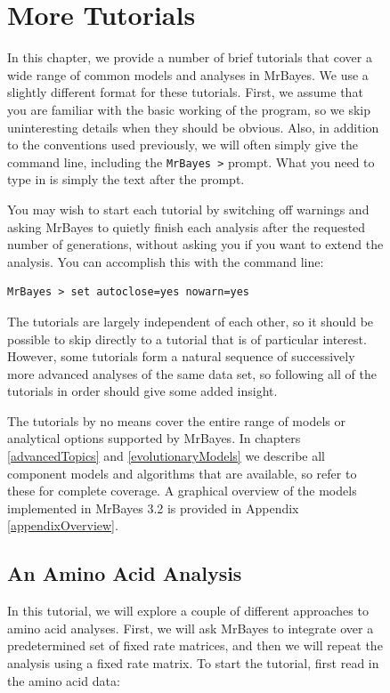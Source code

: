\documentclass[12pt]{book}
\newcommand{\ttt}[1]{\texttt{#1}}
\begin{document}
\begin{figure}[h]
\chapter{More Tutorials}
\label{tutorialAdvanced}

In this chapter, we provide a number of brief tutorials that cover a wide range of common models
and analyses in MrBayes. We use a slightly different format for these tutorials. First, we assume
that you are familiar with the basic working of the program, so we skip uninteresting details when
they should be obvious. Also, in addition to the conventions used previously, we will often simply
give the command line, including the \ttt{MrBayes >} prompt. What you need to type in is simply the
text after the prompt.

You may wish to start each tutorial by switching off warnings and asking MrBayes to quietly finish
each analysis after the requested number of generations, without asking you if you want to extend
the analysis. You can accomplish this with the command line:

\begin{singlespacing}
\small
\begin{verbatim}
MrBayes > set autoclose=yes nowarn=yes
\end{verbatim}
\normalsize
\end{singlespacing}

The tutorials are largely independent of each other, so it should be possible to skip directly to a
tutorial that is of particular interest. However, some tutorials form a natural sequence of
successively more advanced analyses of the same data set, so following all of the tutorials in
order should give some added insight.

The tutorials by no means cover the entire range of models or analytical options supported by
MrBayes. In chapters \ref{advancedTopics} and \ref{evolutionaryModels} we describe all component
models and algorithms that are available, so refer to these for complete coverage. A graphical
overview of the models implemented in MrBayes 3.2 is provided in Appendix \ref{appendixOverview}.

\section{An Amino Acid Analysis}

In this tutorial, we will explore a couple of different approaches to amino acid analyses. First,
we will ask MrBayes to integrate over a predetermined set of fixed rate matrices, and then we will
repeat the analysis using a fixed rate matrix. To start the tutorial, first read in the amino acid
data:


\end{figure}
\end{document}
